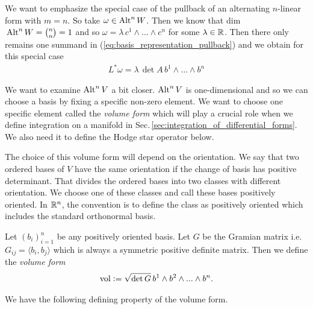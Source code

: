 \documentclass[../master_thesis.tex]{subfiles}
\begin{document}
We want to emphasize the special case of the pullback of an alternating $n$-linear form 
with $m = n$. So take $\omega \in {\text{Alt}^{n}\,W}$. Then we know that 
dim$\,{\text{Alt}^{n}\,W} = {n\choose n} = 1$ and so
$\omega = \lambda\, c^1 \wedge ... \wedge c^n$ for some $\lambda \in \mathbb{R}$. 
Then there only remains one summand in (\ref{eq:basis_representation_pullback}) 
and we obtain for this special case
\begin{align}
    L^* \omega = \lambda \, \det A \, b^1 \wedge ... \wedge b^n
    \label{eq:pullback_alternating_nlinear_map}
\end{align}

We want to examine ${\text{Alt}^{n}\,V}$ a bit closer. 
${\text{Alt}^{n}\,V}$ is one-dimensional and so we can choose a basis by fixing 
a specific non-zero element. We want to choose one specific element 
called the \textit{volume form} which will play a crucial role 
when we define integration on a manifold in Sec.\,\ref{sec:integration_of_differential_forms}. 
We also need it to 
define the Hodge star operator below.

The choice of this volume form will depend on the orientation. 
We say that two ordered bases of $V$ 
have the same orientation if the change of basis has positive determinant. 
That divides the ordered bases into two classes with different orientation.
We choose one of these classes and call these bases positively
oriented. In $\mathbb{R}^n$, the convention is to define the class as 
positively oriented which includes the standard orthonormal basis.

\begin{definition}
    Let $(b_i )_{i=1}^n$ be any positively oriented
    basis. Let $G$ be the Gramian matrix i.e. $G_{ij} = \langle b_i, b_j \rangle$ 
    which is always a symmetric positive definite matrix.
    Then we define the \textit{volume form}
    \begin{align*}
        \operatorname{vol} \vcentcolon= \sqrt{\det G} \, b^1 \wedge b^2 \wedge ... \wedge b^n.
    \end{align*}
\end{definition}

We have the following defining property of the volume form.
\end{document}
